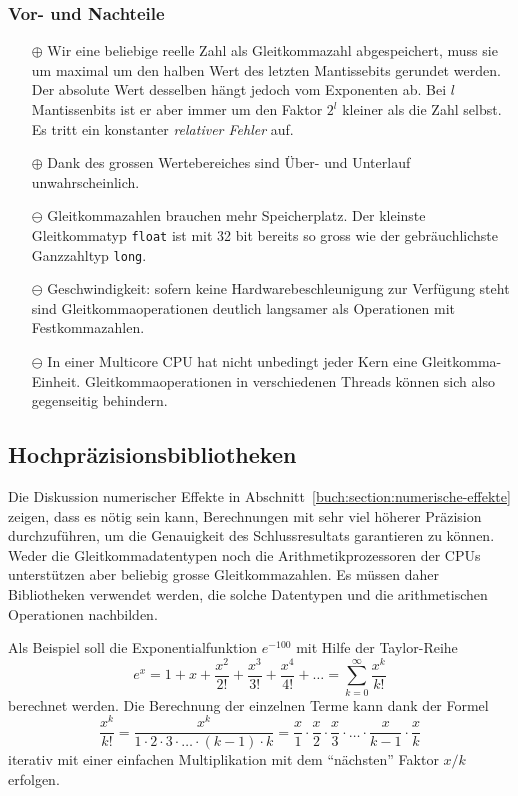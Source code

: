 \subsubsection{Vor- und Nachteile}
\begin{itemize}
\item[$\oplus$]
Wir eine beliebige reelle Zahl als Gleitkommazahl abgespeichert, muss
sie um maximal um den halben Wert des letzten Mantissebits gerundet werden.
Der absolute Wert desselben hängt jedoch vom Exponenten ab.
Bei $l$ Mantissenbits ist er aber immer um den Faktor $2^l$ kleiner
als die Zahl selbst.
Es tritt ein konstanter {\em relativer Fehler} auf.
%
%
\item[$\oplus$] Dank des grossen Wertebereiches sind Über- und Unterlauf
unwahrscheinlich.
%
%
\item[$\ominus$]
Gleitkommazahlen brauchen mehr Speicherplatz.
%
Der kleinste Gleitkommatyp \texttt{float} ist mit 32 bit bereits so gross wie
der gebräuchlichste Ganzzahltyp \texttt{long}.
\item[$\ominus$] Geschwindigkeit: sofern keine Hardwarebeschleunigung
zur Verfügung steht sind Gleitkommaoperationen deutlich langsamer
als Operationen mit Festkommazahlen.
%
\item[$\ominus$]
In einer Multicore CPU hat nicht unbedingt jeder Kern eine Gleitkomma-Einheit.
%
Gleitkommaoperationen in verschiedenen Threads können sich also gegenseitig
behindern.
%
\end{itemize}

%
%
\subsection{Hochpräzisionsbibliotheken
\label{buch:subsection:mp}}
Die Diskussion numerischer Effekte in
Abschnitt~\ref{buch:section:numerische-effekte} zeigen, dass es nötig sein
kann, Berechnungen mit sehr viel höherer Präzision durchzuführen, um die
Genauigkeit des Schlussresultats garantieren zu können.
Weder die Gleitkommadatentypen noch die Arithmetikprozessoren der
CPUs unterstützen aber beliebig grosse Gleitkommazahlen.
Es müssen daher Bibliotheken verwendet werden, die solche Datentypen
und die arithmetischen Operationen nachbilden.

Als Beispiel soll die Exponentialfunktion $e^{-100}$ mit
Hilfe der Taylor-Reihe
\[
e^x
=
1 + x + \frac{x^2}{2!} + \frac{x^3}{3!} + \frac{x^4}{4!} + \dots
=
\sum_{k=0}^\infty \frac{x^k}{k!}
\]
berechnet werden.
%
%
Die Berechnung der einzelnen Terme kann dank der Formel
\begin{equation}
\frac{x^k}{k!}
=
\frac{x^k}{1\cdot 2\cdot 3 \cdot \ldots \cdot (k-1)\cdot k}
=
\frac{x}{1}
\cdot
\frac{x}{2}
\cdot
\frac{x}{3}
\cdot\dots\cdot
\frac{x}{k-1}
\cdot
\frac{x}{k}
\label{buch:eulerreihe:faktor}
\end{equation}
iterativ mit einer einfachen Multiplikation mit dem ``nächsten'' 
Faktor $x/k$ erfolgen.

